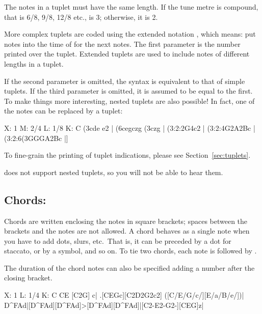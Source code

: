 \documentclass[a4paper,fullpage,12pt]{book}
\begin{document}
The notes in a tuplet must have the same length. If the tune metre is
compound, that is 6/8, 9/8, 12/8 etc.,  is 3; otherwise, it is
2.

More complex tuplets are coded using the extended notation 
, which means: put  notes
into the time of  for the next  notes. The first
parameter is the number printed over the tuplet. Extended tuplets are
used to include notes of different lengths in a tuplet.

If the second parameter is omitted, the syntax is equivalent to that
of simple tuplets. If the third parameter is omitted, it is assumed to
be equal to the first. To make things more interesting, nested tuplets
are also possible! In fact, one of the notes can be replaced by a
tuplet:

\begin{abcsource}
X: 1
M: 2/4
L: 1/8
K: C
(3cde e2 | (6cegczg (3czg |
(3:2:2G4c2 | (3:2:4G2A2Bc | (3:2:6(3GGGA2Bc |]
\end{abcsource}


To fine-grain the printing of tuplet indications, please see
Section~\ref{sec:tuplets}.

\begin{warn}

  \abcMID{} does not support nested tuplets, so you will not be able
  to hear them.

\end{warn}


\subsection{Chords: \icmd{[]}}

Chords are written enclosing the notes in square brackets; spaces
between the brackets and the notes are not allowed. A chord behaves as
a single note when you have to add dots, slurs, etc.\ That is, it can
be preceded by a dot for staccato, or by a symbol, and so on. To tie
two chords, each note is followed by \car{-}.

The duration of the chord notes can also be specified adding a number
after the closing bracket.

\begin{abcsource}
X: 1
L: 1/4
K: C
CE [C2G] c| .[CEGc][C2D2G2c2] ([C/E/G/c/][E/a/B/e/])|
D^FAd|[D^FAd][D^FAd]>[D^FAd][D^FAd]|[C2-E2-G2-][CEG]z|
\end{abcsource}
\end{document}

